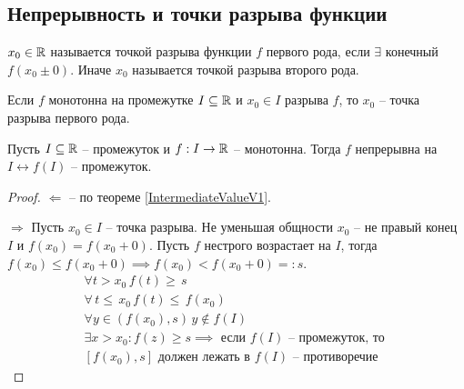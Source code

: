 \subsection{Непрерывность и точки разрыва функции}
\begin{definition}
	 $ x_0 \in \mathbb{R} $ называется точкой разрыва функции $ f $ первого рода, если $ \exists  $ конечный $ f(x_0 \pm 0) $. Иначе $ x_0 $ называется точкой разрыва второго рода.
\end{definition}
\begin{corollary}
	Если $ f $ монотонна на промежутке $ I \subseteq \mathbb{R} $ и $ x_0\in I $ разрыва $ f $, то $ x_0 $ -- точка разрыва первого рода.
\end{corollary}
\begin{theorem}
	Пусть $ I \subseteq \mathbb{R} $ -- промежуток и $ f: I \to  \mathbb{R} $ -- монотонна. Тогда $ f $ непрерывна на $ I \longleftrightarrow f(I)$ -- промежуток.
\end{theorem} \begin{proof}
	 $ \Leftarrow $ -- по теореме \ref{IntermediateValueV1}. 

	 $ \Rightarrow $ Пусть $ x_0 \in I $ -- точка разрыва. Не уменьшая общности $ x_0 $ -- не правый конец $ I $ и $ f(x_0) = f(x_0 + 0) $. Пусть $ f $ нестрого возрастает на $ I $, тогда $ f(x_0) \leq f(x_0 + 0) \implies f(x_0) < f(x_0 + 0) =: s$. \begin{gather}
		\forall t > x_0\, f(t) \geq\, s \\
		\forall\, t \leq\, x_0\, f(t) \leq\, f(x_0) \\ 
		\forall y \in (f(x_0), s)\, y \notin f(I) \\
		\exists x > x_0: f(z) \geq s \implies \text{ если } f(I) \text{ -- промежуток, то }\\
		 [f(x_0), s] \text{ должен лежать в  } f(I) \text{ -- противоречие }
	 \end{gather}
	 
\end{proof}